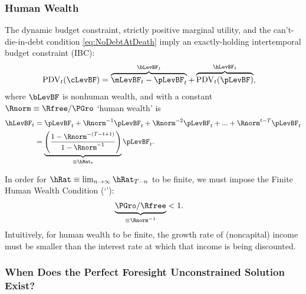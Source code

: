 \documentclass[BufferStockTheory]{subfiles}
\begin{document}
\subsubsection{Human Wealth}
The dynamic budget constraint, strictly positive marginal utility, and the can't-die-in-debt condition \eqref{eq:NoDebtAtDeath} imply an exactly-holding intertemporal budget constraint (IBC):
\begin{align}
  \mathrm{PDV}_{t}(\cLevBF)  & = \overbrace{\mLevBF_{t}-\pLevBF_{t}}^{\bLevBF_{t}}+\overbrace{\mathrm{PDV}_{t}(\pLevBF)}^{\hLevBF_{t}}, \label{eq:IBCFinite}
\end{align} \hypertarget{FHWF}{}
where $\bLevBF$ is nonhuman wealth, and with a constant $\Rnorm \equiv \Rfree/\PGro$ `human wealth' is
\begin{align}
  \hLevBF_{t}  & = \pLevBF_{t}+\Rnorm^{-1} \pLevBF_{t} + \Rnorm^{-2} \pLevBF_{t} + ... + \Rnorm^{t-T} \pLevBF_{t} \notag 
  \\  & = \underbrace{\left(\frac{1-\Rnorm^{-(T-t+1)}}{1-\Rnorm^{-1}}\right)}_{\equiv \hRat_{t}}\pLevBF_{t} \label{eq:HDef}.
\end{align}

\hypertarget{FHWC}{}
In order for $\hRat \equiv \lim_{n \rightarrow
  \infty} \hRat_{T-n}$ to be finite, we must
impose the Finite Human Wealth Condition (`\FHWC'): 
\begin{align}
  \underbrace{\PGro/\Rfree}_{\equiv \Rnorm^{-1}}  & < 1 \label{eq:FHWC}.
\end{align}
Intuitively, for human wealth to be finite, the growth rate of (noncapital) income must be smaller than the interest rate at which that income is being discounted.

\hypertarget{Unconstrained-Solution}{}
\hypertarget{PF-Unconstrained-Solution}{}
\subsubsection{When Does the Perfect Foresight Unconstrained Solution Exist?} \label{subsec:PFUncon}

\hypertarget{APF}{}
\hypertarget{AIC}{}
\end{document}

